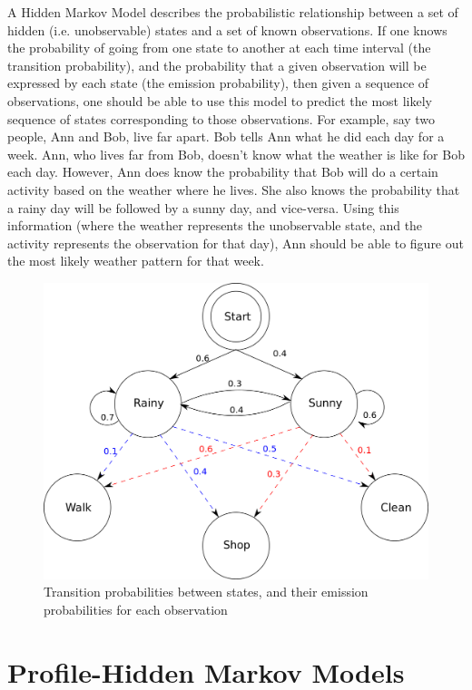 \documentclass{article}
\begin{document}
A Hidden Markov Model describes the probabilistic relationship between a set of hidden (i.e. unobservable) states and a set of known observations. If one knows the probability of going from one state to another at each time interval (the transition probability), and the probability that a given observation will be expressed by each state (the emission probability), then given a sequence of observations, one should be able to use this model to predict the most likely sequence of states corresponding to those observations. For example, say two people, Ann and Bob, live far apart. Bob tells Ann what he did each day for a week. Ann, who lives far from Bob, doesn't know what the weather is like for Bob each day. However, Ann does know the probability that Bob will do a certain activity based on the weather where he lives. She also knows the probability that a rainy day will be followed by a sunny day, and vice-versa. Using this information (where the weather represents the unobservable state, and the activity represents the observation for that day), Ann should be able to figure out the most likely weather pattern for that week.
\begin{figure}[H]
\centering
\includegraphics[width=.5\textwidth]{materials/HMMGraph.png}
\caption{Transition probabilities between states, and their emission probabilities for each observation\footnotemark[2]}
\end{figure}


\section{Profile-Hidden Markov Models}
\end{document}
